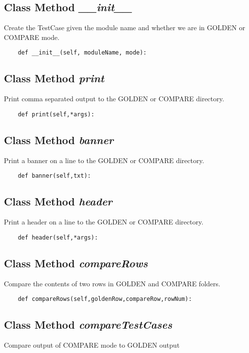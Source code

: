 \documentclass[twoside,11pt]{book}
\begin{document}
\subsection{Class Method {\it \_\_init\_\_}}
Create the TestCase given the module name and whether we are in GOLDEN or COMPARE mode. 

\begin{lstlisting}
    def __init__(self, moduleName, mode):
\end{lstlisting}

\subsection{Class Method {\it print}}
Print comma separated output to the GOLDEN or COMPARE directory. 

\begin{lstlisting}
    def print(self,*args):
\end{lstlisting}

\subsection{Class Method {\it banner}}
Print a banner on a line to the GOLDEN or COMPARE directory. 

\begin{lstlisting}
    def banner(self,txt):
\end{lstlisting}

\subsection{Class Method {\it header}}
Print a header on a line to the GOLDEN or COMPARE directory. 

\begin{lstlisting}
    def header(self,*args):
\end{lstlisting}

\subsection{Class Method {\it compareRows}}
Compare the contents of two rows in GOLDEN and COMPARE folders.

\begin{lstlisting}
    def compareRows(self,goldenRow,compareRow,rowNum):
\end{lstlisting}

\subsection{Class Method {\it compareTestCases}}
Compare output of COMPARE mode to GOLDEN output 
\end{document}
